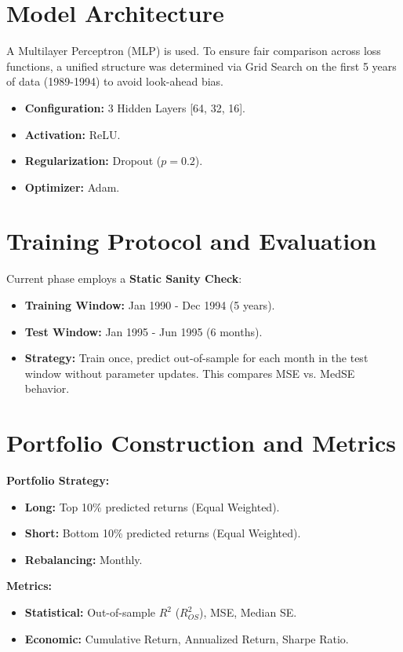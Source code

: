 \documentclass[openany]{book}
\numberwithin{figure}{chapter}
\numberwithin{equation}{chapter}
\begin{document}
\section{Model Architecture}
A Multilayer Perceptron (MLP) is used. To ensure fair comparison across loss functions, a unified structure was determined via Grid Search on the first 5 years of data (1989-1994) to avoid look-ahead bias.
\begin{itemize}
    \item \textbf{Configuration:} 3 Hidden Layers [64, 32, 16].
    \item \textbf{Activation:} ReLU.
    \item \textbf{Regularization:} Dropout ($p=0.2$).
    \item \textbf{Optimizer:} Adam.
\end{itemize}

\section{Training Protocol and Evaluation}
Current phase employs a \textbf{Static Sanity Check}:
\begin{itemize}
    \item \textbf{Training Window:} Jan 1990 - Dec 1994 (5 years).
    \item \textbf{Test Window:} Jan 1995 - Jun 1995 (6 months).
    \item \textbf{Strategy:} Train once, predict out-of-sample for each month in the test window without parameter updates. This compares MSE vs. MedSE behavior.
\end{itemize}

\section{Portfolio Construction and Metrics}
\textbf{Portfolio Strategy:}
\begin{itemize}
    \item \textbf{Long:} Top 10\% predicted returns (Equal Weighted).
    \item \textbf{Short:} Bottom 10\% predicted returns (Equal Weighted).
    \item \textbf{Rebalancing:} Monthly.
\end{itemize}

\textbf{Metrics:}
\begin{itemize}
    \item \textbf{Statistical:} Out-of-sample $R^2$ ($R^2_{OS}$), MSE, Median SE.
    \item \textbf{Economic:} Cumulative Return, Annualized Return, Sharpe Ratio.
\end{itemize}
\end{document}
